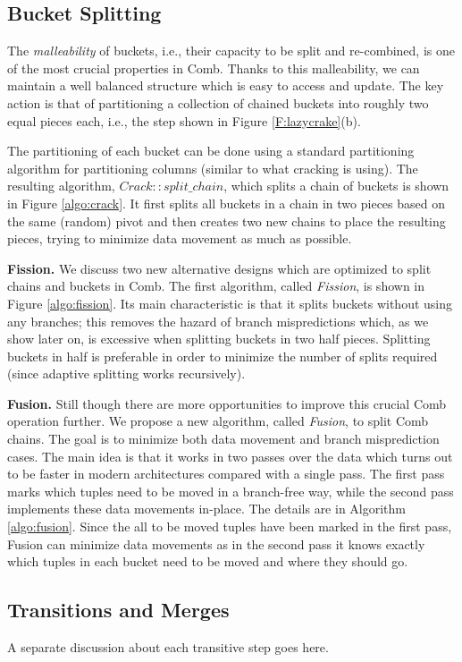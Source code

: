 \documentclass{sig-alternate}
\begin{document}
\subsection{Bucket Splitting}
\label{sec:splitting}

The {\em malleability} of buckets, i.e., their capacity to be split and re-combined,
is one of the most crucial properties in Comb.
Thanks to this malleability, we can maintain a well balanced structure which is easy to access and update.
The key action is that of partitioning a collection of chained buckets into roughly two equal pieces each, i.e.,
the step shown in Figure \ref{F:lazycrake}(b).

The partitioning of each bucket can be done using a standard partitioning algorithm
for partitioning columns (similar to what cracking is using).
The resulting algorithm, $Crack::split\_chain$, which splits a chain of buckets is shown in Figure \ref{algo:crack}.
It first splits all buckets in a chain in two pieces based on the same (random) pivot and then creates two new chains
to place the resulting pieces, trying to minimize data movement as much as possible.


\textbf{Fission.}
We discuss two new alternative designs which are optimized to split chains and buckets in Comb.
The first algorithm, called \emph{Fission}, is shown in
Figure \ref{algo:fission}. Its main characteristic is that it splits buckets without using any branches;
this removes the hazard of branch mispredictions which, as we show later on,
is excessive when splitting buckets in two half pieces.
Splitting buckets in half is preferable in order to minimize the number of splits required
(since adaptive splitting works recursively).

\textbf{Fusion.}
Still though there are more opportunities to improve this crucial Comb operation further.
We propose a new algorithm, called \emph{Fusion}, to split Comb chains.
The goal is to minimize both data movement and branch misprediction cases.
The main idea is that it works in two passes over the data which turns
out to be faster in modern architectures compared with a single pass.
The first pass marks which tuples need to be moved in a branch-free way,
while the second pass implements these data movements in-place.
The details are in Algorithm \ref{algo:fusion}.
Since the all to be moved tuples have been marked in the first pass, Fusion can minimize data movements
as in the second pass it knows exactly which tuples in each bucket need to be moved and where they should go.



\subsection{Transitions and Merges}\label{sec:transitions}

A separate discussion about each transitive step goes here.






%
%




\end{document}
